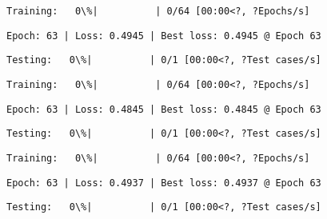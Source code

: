 \documentclass[11pt]{article}
\begin{document}
    
    
    \begin{Verbatim}[commandchars=\\\{\}]
Training:   0\%|          | 0/64 [00:00<?, ?Epochs/s]
    \end{Verbatim}

    
    \begin{Verbatim}[commandchars=\\\{\}]
Epoch: 63 | Loss: 0.4945 | Best loss: 0.4945 @ Epoch 63
    \end{Verbatim}

    
    \begin{Verbatim}[commandchars=\\\{\}]
Testing:   0\%|          | 0/1 [00:00<?, ?Test cases/s]
    \end{Verbatim}

    
    
    \begin{Verbatim}[commandchars=\\\{\}]
Training:   0\%|          | 0/64 [00:00<?, ?Epochs/s]
    \end{Verbatim}

    
    \begin{Verbatim}[commandchars=\\\{\}]
Epoch: 63 | Loss: 0.4845 | Best loss: 0.4845 @ Epoch 63
    \end{Verbatim}

    
    \begin{Verbatim}[commandchars=\\\{\}]
Testing:   0\%|          | 0/1 [00:00<?, ?Test cases/s]
    \end{Verbatim}

    
    
    \begin{Verbatim}[commandchars=\\\{\}]
Training:   0\%|          | 0/64 [00:00<?, ?Epochs/s]
    \end{Verbatim}

    
    \begin{Verbatim}[commandchars=\\\{\}]
Epoch: 63 | Loss: 0.4937 | Best loss: 0.4937 @ Epoch 63
    \end{Verbatim}

    
    \begin{Verbatim}[commandchars=\\\{\}]
Testing:   0\%|          | 0/1 [00:00<?, ?Test cases/s]
    \end{Verbatim}
\end{document}

